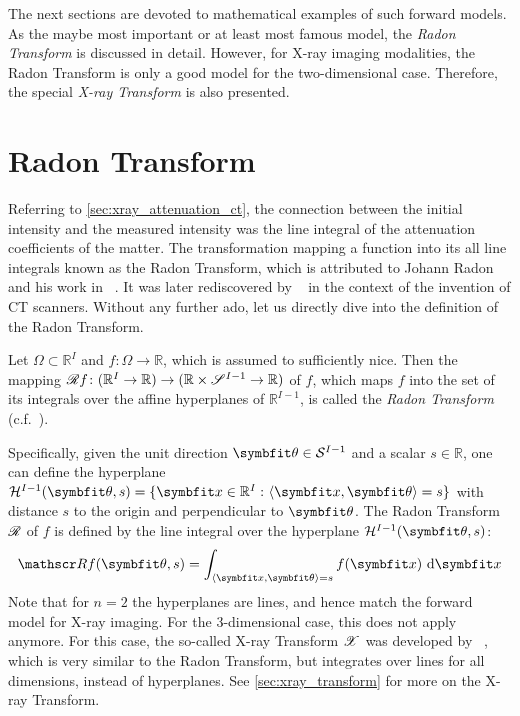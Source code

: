The next sections are devoted to mathematical examples of such forward models. As the maybe most
important or at least most famous model, the \textit{Radon Transform} is discussed in detail.
However, for X-ray imaging modalities, the Radon Transform is only a good model for the
two-dimensional case. Therefore, the special \textit{X-ray Transform} is also presented.

\section{Radon Transform}\label{sec:radon_transform}

Referring to \autoref{sec:xray_attenuation_ct}, the connection between the initial intensity and the
measured intensity was the line integral of the attenuation coefficients of the matter. The
transformation mapping a function into its all line integrals known as the Radon Transform, which is
attributed to Johann Radon and his work in
\citeyear{radon_uber_1917}~\cite{radon_uber_1917,radon_determination_1986}. It was later
rediscovered by \citeauthor{cormack_representation_1963}~\cite{cormack_representation_1963} in the
context of the invention of CT scanners. Without any further ado, let us directly dive into the
definition of the Radon Transform.

\begin{definition}\label{def:radon_transform}
	Let \(\Omega \subset \mathbb{R}^I\) and \(f\colon \Omega \to \mathbb{R}\), which is assumed
	to sufficiently nice. Then the mapping \(\radon f\colon (\mathbb{R}^I \to \mathbb{R})
	\to (\mathbb{R} \times \mathscr{S}^{I-1} \to \mathbb{R})\) of \(f\), which maps \(f\) into
	the set of its integrals over the affine hyperplanes of \(\mathbb{R}^{I-1}\), is called the
	\textit{Radon Transform} (c.f.~\cite{natterer_mathematics_1986,buzug_computed_2008,carpio_inverse_2008}).
\end{definition}

Specifically, given the unit direction \(\mvec{\theta} \in \mathcal{S}^{I-1}\) and a scalar \(s \in
\mathbb{R}\), one can define the hyperplane \(\mathcal{H}^{I-1}(\mvec{\theta}, s) = \lbrace \mvec{x}
\in \mathbb{R}^I \, \colon \langle \mvec{x}, \mvec{\theta} \rangle = s  \rbrace\) with distance
\(s\) to the origin and perpendicular to \(\mvec{\theta}\). The Radon Transform \(\mathscr{R}\) of \(f\)
is defined by the line integral over the hyperplane \(\mathcal{H}^{I-1}(\mvec{\theta}, s)\):
\begin{equation}\label{eq:radon_transform}
	\radon f(\mvec{\theta}, s) = \int_{\langle \mvec{x}, \mvec{\theta} \rangle = s} f(\mvec{x}) \, \, \mathrm{d}\mvec{x}
\end{equation}
Note that for \(n=2\) the hyperplanes are lines, and hence match the forward model for X-ray
imaging. For the 3-dimensional case, this does not apply anymore. For this case, the so-called X-ray
Transform \(\mathscr{X}\) was developed by \citeauthor*{solmon_x-ray_1976}~\cite{solmon_x-ray_1976}, which
is very similar to the Radon Transform, but integrates over lines for all dimensions, instead of
hyperplanes. See \autoref{sec:xray_transform} for more on the X-ray Transform.

